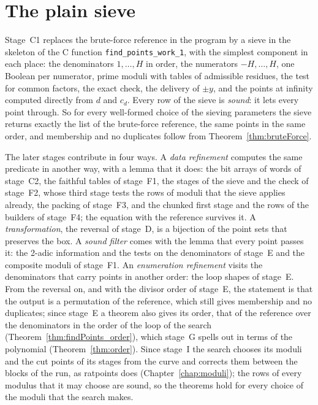 \chapter{The plain sieve}\label{chap:sieve}

Stage~C1 replaces the brute-force reference in the program by a sieve in the skeleton of the C
function \verb|find_points_work_1|, with the simplest component in each place: the denominators
$1, \dots, H$ in order, the numerators $-H, \dots, H$, one Boolean per numerator, prime moduli
with tables of admissible residues, the test for common factors, the exact check, the delivery of
$\pm y$, and the points at infinity computed directly from $d$ and $c_d$. Every row of the sieve is
\emph{sound}: it lets every point through. So for every well-formed choice of the sieving
parameters the sieve returns exactly the list of the brute-force reference, the same points in the
same order, and membership and no duplicates follow from Theorem~\ref{thm:bruteForce}.

The later stages contribute in four ways. A \emph{data refinement} computes the same predicate in
another way, with a lemma that it does: the bit arrays of words of stage~C2, the faithful tables of
stage~F1, the stages of the sieve and the check of stage~F2, whose third stage tests the rows of
moduli that the sieve applies already, the packing of stage~F3, and the chunked first stage and the
rows of the builders of stage~F4; the equation with the reference survives it. A
\emph{transformation}, the reversal of stage~D, is a bijection of the point sets that preserves the
box. A \emph{sound filter} comes with the lemma that every point passes it: the 2-adic information
and the tests on the denominators of stage~E and the composite moduli of stage~F1. An
\emph{enumeration refinement} visits the denominators that carry points in another order: the loop
shapes of stage~E. From the reversal on, and with the divisor order of stage~E, the statement is
that the output is a permutation of the reference, which still gives membership and no duplicates;
since stage~E a theorem also gives its order, that of the reference over the denominators in the
order of the loop of the search (Theorem~\ref{thm:findPoints_order}), which stage~G spells out in
terms of the polynomial (Theorem~\ref{thm:order}). Since stage~I the search chooses its moduli and
the cut points of its stages from the curve and corrects them between the blocks of the run, as
ratpoints does (Chapter~\ref{chap:moduli}); the rows of every modulus that it may choose are sound,
so the theorems hold for every choice of the moduli that the search makes.

